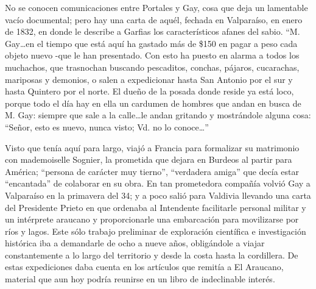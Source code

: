 \documentclass[10pt,twoside,openright]{memoir}
\begin{document}
No se conocen comunicaciones entre Portales y Gay, cosa que deja un
lamentable vacío documental; pero hay una carta de aquél, fechada en
Valparaíso, en enero de 1832, en donde le describe a Garfias los
característicos afanes del sabio. ``M. Gay\ldots en el tiempo que está aquí
ha gastado más de \$150 en pagar a peso cada objeto nuevo -que le han
presentado. Con esto ha puesto en alarma a todos los muchachos, que
trasnochan buscando pescaditos, conchas, pájaros, cucarachas, mariposas
y demonios, o salen a expedicionar hasta San Antonio por el sur y hasta
Quintero por el norte. El dueño de la posada donde reside ya está loco,
porque todo el día hay en ella un cardumen de hombres que andan en busca
de M. Gay: siempre que sale a la calle\ldots le andan gritando y
mostrándole alguna cosa: ``Señor, esto es nuevo, nunca visto; Vd. no lo
conoce\ldots''

Visto que tenía aquí para largo, viajó a Francia para formalizar su
matrimonio con mademoiselle Sognier, la prometida que dejara en Burdeos
al partir para América; ``persona de carácter muy tierno'', ``verdadera
amiga'' que decía estar ``encantada'' de colaborar en su obra. En tan
prometedora compañía volvió Gay a Valparaíso en la primavera del 34; y a
poco salió para Valdivia llevando una carta del Presidente Prieto en que
ordenaba al Intendente facilitarle personal militar y un intérprete
araucano y proporcionarle una embarcación para movilizarse por ríos y
lagos. Este sólo trabajo preliminar de exploración científica e
investigación histórica iba a demandarle de ocho a nueve años,
obligándole a viajar constantemente a lo largo del territorio y desde la
costa hasta la cordillera. De estas expediciones daba cuenta en los
artículos que remitía a El Araucano, material que aun hoy podría
reunirse en un libro de indeclinable interés.
\end{document}
